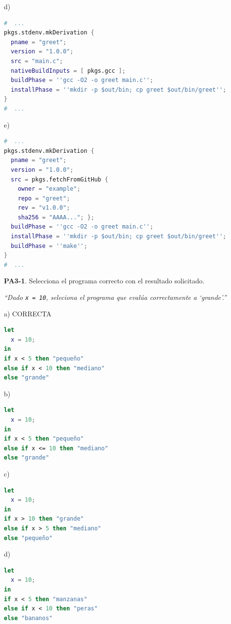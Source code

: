 \begin{opcion}{d)}
\begin{lstlisting}[language=nix]
#  ...
pkgs.stdenv.mkDerivation {
  pname = "greet";
  version = "1.0.0";
  src = "main.c";
  nativeBuildInputs = [ pkgs.gcc ];
  buildPhase = ''gcc -O2 -o greet main.c'';
  installPhase = ''mkdir -p $out/bin; cp greet $out/bin/greet'';
}
#  ...
\end{lstlisting}
\end{opcion}

\begin{opcion}{e)}
\begin{lstlisting}[language=nix]
#  ...
pkgs.stdenv.mkDerivation {
  pname = "greet";
  version = "1.0.0";
  src = pkgs.fetchFromGitHub {
    owner = "example";
    repo = "greet";
    rev = "v1.0.0";
    sha256 = "AAAA..."; };
  buildPhase = ''gcc -O2 -o greet main.c'';
  installPhase = ''mkdir -p $out/bin; cp greet $out/bin/greet'';
  buildPhase = ''make'';
}
#  ...
\end{lstlisting}
\end{opcion}

\textbf{PA3-1}. Selecciona el programa correcto con el resultado solicitado.

\emph{``Dado \texttt{x = 10}, seleciona el programa que evalúa correctamente a `grande'.''}

\begin{opcion}{a)}
CORRECTA
\begin{lstlisting}[language=nix]
let
  x = 10;
in
if x < 5 then "pequeño"
else if x < 10 then "mediano"
else "grande"
\end{lstlisting}
\end{opcion}

\begin{opcion}{b)}
\begin{lstlisting}[language=nix]
let
  x = 10;
in
if x < 5 then "pequeño"
else if x <= 10 then "mediano"
else "grande"
\end{lstlisting}
\end{opcion}

\begin{opcion}{c)}
\begin{lstlisting}[language=nix]
let
  x = 10;
in
if x > 10 then "grande"
else if x > 5 then "mediano"
else "pequeño"
\end{lstlisting}
\end{opcion}

\begin{opcion}{d)}
\begin{lstlisting}[language=nix]
let
  x = 10;
in
if x < 5 then "manzanas"
else if x < 10 then "peras"
else "bananos"
\end{lstlisting}
\end{opcion}

